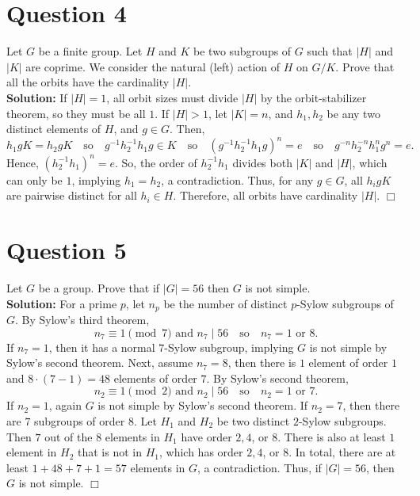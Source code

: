 \documentclass[12pt]{article}
\begin{document}
\section*{Question 4}
Let $G$ be a finite group. Let $H$ and $K$ be two subgroups of $G$ such that $|H|$ and $|K|$ are coprime. We consider the natural (left) action of $H$ on $G/K$. Prove that all the orbits have the cardinality $|H|$. \\

\noindent \textbf{Solution:} If $|H| = 1$, all orbit sizes must divide $|H|$ by the orbit-stabilizer theorem, so they must be all $1$. If $|H| > 1$, let $|K| = n$, and $h_1,h_2$ be any two distinct elements of $H$, and $g\in G$. Then, \[h_1gK = h_2gK\quad\text{so}\quad g^{-1}h_2^{-1}h_1g \in K\quad \text{so}\quad (g^{-1}h_2^{-1}h_1g)^n = e\quad \text{so}\quad g^{-n}h_2^{-n}h_1^ng^n = e.\] 
Hence, $(h_2^{-1}h_1)^n = e$. So, the order of $h_2^{-1}h_1$ divides both $|K|$ and $|H|$, which can only be $1$, implying $h_1 = h_2$, a contradiction. Thus, for any $g \in G$, all $h_igK$ are pairwise distinct for all $h_i \in H$. Therefore, all orbits have cardinality $|H|$. \hfill $\Box$

\section*{Question 5}
Let $G$ be a group. Prove that if $|G| = 56$ then $G$ is not simple. \\

\noindent \textbf{Solution:} For a prime $p$, let $n_p$ be the number of distinct $p$-Sylow subgroups of $G$. By Sylow's third theorem, \[n_7\equiv 1\pmod 7\text{ and }n_7\mid 56\quad\text{so}\quad n_7=1\text{ or }8.\] 
If $n_7 = 1$, then it has a normal $7$-Sylow subgroup, implying $G$ is not simple by Sylow's second theorem. Next, assume $n_7 = 8$, then there is $1$ element of order $1$ and $8 \cdot (7 - 1) = 48$ elements of order $7$.
\newline
\newline By Sylow's second theorem, \[n_2\equiv 1\pmod 2\text{ and }n_2\mid 56\quad\text{so}\quad n_2=1\text{ or }7.\] 
If $n_2 = 1$, again $G$ is not simple by Sylow's second theorem. If $n_2 = 7$, then there are $7$ subgroups of order $8$. Let $H_1$ and $H_2$ be two distinct $2$-Sylow subgroups. Then $7$ out of the $8$ elements in $H_1$ have order $2, 4$, or $8$. There is also at least $1$ element in $H_2$ that is not in $H_1$, which has order $2, 4$, or $8$. In total, there are at least $1 + 48 + 7 + 1 = 57$ elements in $G$, a contradiction. Thus, if $|G| = 56$, then $G$ is not simple. \hfill $\Box$
\newpage
\end{document}
